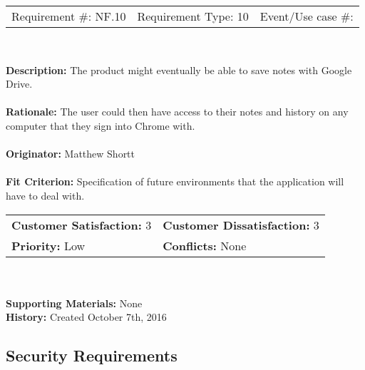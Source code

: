 \documentclass[12pt, titlepage]{article}
\begin{document}
\begin{framed}
	
	\begin{center}
		
		\begin{tabular}{ l c r }
			Requirement \#: NF.10 & Requirement Type: 10 & Event/Use case \#: \\
		\end{tabular} \\
	\end{center}
	\textbf{Description:} The product might eventually be able to save notes with Google 
	Drive.\\
	\\
	\textbf{Rationale:} The user could then have access to their notes and history on any 
	computer that they sign into Chrome with.  \\
	\\
	\textbf{Originator:} Matthew Shortt \\
	\\
	\textbf{Fit Criterion:} Specification of future environments that the application will have 
	to deal with. 
	\\
	
	\begin{tabular}{ll}
		\textbf{Customer Satisfaction:} 3 & \textbf{Customer Dissatisfaction:} 3 \\
		\textbf{Priority:} Low & \textbf{Conflicts:} None\\
	\end{tabular} \\
	\\
	\textbf{Supporting Materials:} None \\
	\textbf{History:} Created October 7th, 2016
	
\end{framed}

\subsection{Security Requirements}
\end{document}
